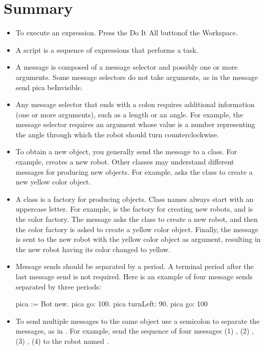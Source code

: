 \documentclass[a4paper,10pt,twoside]{book}
\begin{document}
\section{Summary}

\begin{itemize}
	\item To execute an expression. Press the Do It All buttonof the Workspace. 
	

\item A script is a sequence of expressions that performs a task. 
\item A message is composed of a message selector and possibly one or more arguments. Some 
message selectors do not take arguments, as in the message send pica beInvisible. 
\item  Any message selector that ends with a colon requires additional information (one or 
more arguments), such as a length or an angle. For example, the message selector 
 requires an argument whose value is a number representing the angle 
through which the robot should turn counterclockwise. 
\item  To obtain a new object, you generally send the message  to a class. For example,  
 creates a new robot. Other classes may understand different messages for producing new objects. For example,  asks the class  to create a new yellow 
color object. 
\item  A class is a factory for producing objects. Class names always start with an uppercase 
letter. For example,  is the factory for creating new robots, and  is the color 
factory. The message  asks the  class to create a new 
robot, and then the color factory is asked to create a yellow color object. Finally, the 
message  is sent to the new robot with the yellow color object as argument, 
resulting in the new robot having its color changed to yellow. 

\item  Message sends should be separated by a period. A terminal period after the last message 
send is not required. Here is an example of four message sends separated by three periods: 
\begin{code}{}
pica := Bot new. 
pica go: 100. 
pica turnLeft: 90. 
pica go: 100 
\end{code}

\item  To send multiple messages to the same object use a semicolon to separate the messages, as in 
. For example,  send the sequence of four messages (1) , (2) , (3) , (4)  to the robot named . 
\end{itemize}



\ifx\wholebook\relax\else
    
\end{document}

